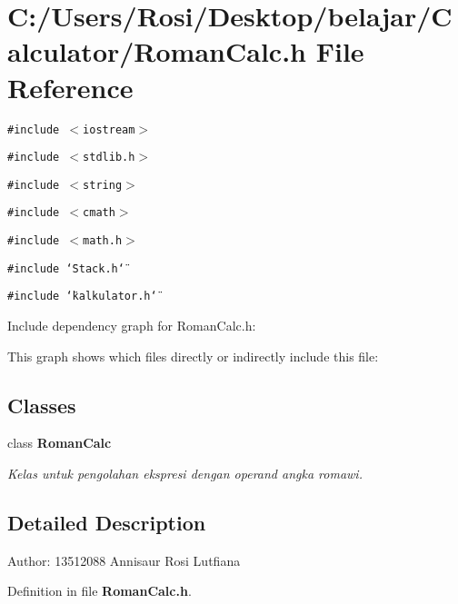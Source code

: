 \section{C:/Users/Rosi/Desktop/belajar/Calculator/Roman\-Calc.h File Reference}
\label{_roman_calc_8h}
{\tt \#include $<$iostream$>$}\par
{\tt \#include $<$stdlib.h$>$}\par
{\tt \#include $<$string$>$}\par
{\tt \#include $<$cmath$>$}\par
{\tt \#include $<$math.h$>$}\par
{\tt \#include \char`\"{}Stack.h\char`\"{}}\par
{\tt \#include \char`\"{}kalkulator.h\char`\"{}}\par


Include dependency graph for Roman\-Calc.h:

This graph shows which files directly or indirectly include this file:\subsection*{Classes}
\begin{CompactItemize}
\item 
class {\bf Roman\-Calc}
\begin{CompactList}\small\item\em Kelas untuk pengolahan ekspresi dengan operand angka romawi. \item\end{CompactList}\end{CompactItemize}


\subsection{Detailed Description}
\begin{Desc}
\item[Author:]13512088 Annisaur Rosi Lutfiana \end{Desc}


Definition in file {\bf Roman\-Calc.h}.